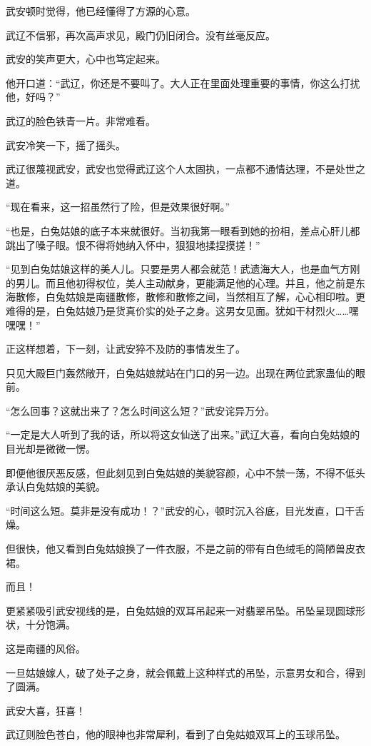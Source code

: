 \begin{this_body}
武安顿时觉得，他已经懂得了方源的心意。

武辽不信邪，再次高声求见，殿门仍旧闭合。没有丝毫反应。

武安的笑声更大，心中也笃定起来。

他开口道：“武辽，你还是不要叫了。大人正在里面处理重要的事情，你这么打扰他，好吗？”

武辽的脸色铁青一片。非常难看。

武安冷笑一下，摇了摇头。

武辽很蔑视武安，武安也觉得武辽这个人太固执，一点都不通情达理，不是处世之道。

“现在看来，这一招虽然行了险，但是效果很好啊。”

“也是，白兔姑娘的底子本来就很好。当初我第一眼看到她的扮相，差点心肝儿都跳出了嗓子眼。恨不得将她纳入怀中，狠狠地揉捏摸搓！”

“见到白兔姑娘这样的美人儿。只要是男人都会就范！武遗海大人，也是血气方刚的男儿。而且他初得权位，美人主动献身，更能满足他的心理。并且，他之前是东海散修，白兔姑娘是南疆散修，散修和散修之间，当然相互了解，心心相印啦。更难得的是，白兔姑娘乃是货真价实的处子之身。这男女见面。犹如干材烈火……嘿嘿嘿！”

正这样想着，下一刻，让武安猝不及防的事情发生了。

只见大殿巨门轰然敞开，白兔姑娘就站在门口的另一边。出现在两位武家蛊仙的眼前。

“怎么回事？这就出来了？怎么时间这么短？”武安诧异万分。

“一定是大人听到了我的话，所以将这女仙送了出来。”武辽大喜，看向白兔姑娘的目光却是微微一愣。

即便他很厌恶反感，但此刻见到白兔姑娘的美貌容颜，心中不禁一荡，不得不低头承认白兔姑娘的美貌。

“时间这么短。莫非是没有成功！？”武安的心，顿时沉入谷底，目光发直，口干舌燥。

但很快，他又看到白兔姑娘换了一件衣服，不是之前的带有白色绒毛的简陋兽皮衣裙。

而且！

更紧紧吸引武安视线的是，白兔姑娘的双耳吊起来一对翡翠吊坠。吊坠呈现圆球形状，十分饱满。

这是南疆的风俗。

一旦姑娘嫁人，破了处子之身，就会佩戴上这种样式的吊坠，示意男女和合，得到了圆满。

武安大喜，狂喜！

武辽则脸色苍白，他的眼神也非常犀利，看到了白兔姑娘双耳上的玉球吊坠。


\end{this_body}
